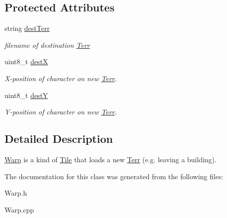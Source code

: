 \subsection*{Protected Attributes}
\begin{DoxyCompactItemize}
\item 
string \hyperlink{class_warp_a37b259e72467ec5dfe8a6e4c3a137eb3}{dest\+Terr}\hypertarget{class_warp_a37b259e72467ec5dfe8a6e4c3a137eb3}{}\label{class_warp_a37b259e72467ec5dfe8a6e4c3a137eb3}

\begin{DoxyCompactList}\small\item\em filename of destination \hyperlink{class_terr}{Terr} \end{DoxyCompactList}\item 
uint8\+\_\+t \hyperlink{class_warp_a263818ce83fe48de61f9d9cc99384cba}{destX}\hypertarget{class_warp_a263818ce83fe48de61f9d9cc99384cba}{}\label{class_warp_a263818ce83fe48de61f9d9cc99384cba}

\begin{DoxyCompactList}\small\item\em X-\/position of character on new \hyperlink{class_terr}{Terr}. \end{DoxyCompactList}\item 
uint8\+\_\+t \hyperlink{class_warp_a6407a57d12ab0c17d6c1f9dce479b635}{destY}\hypertarget{class_warp_a6407a57d12ab0c17d6c1f9dce479b635}{}\label{class_warp_a6407a57d12ab0c17d6c1f9dce479b635}

\begin{DoxyCompactList}\small\item\em Y-\/position of character on new \hyperlink{class_terr}{Terr}. \end{DoxyCompactList}\end{DoxyCompactItemize}


\subsection{Detailed Description}
\hyperlink{class_warp}{Warp} is a kind of \hyperlink{class_tile}{Tile} that loads a new \hyperlink{class_terr}{Terr} (e.\+g. leaving a building). 

The documentation for this class was generated from the following files\+:\begin{DoxyCompactItemize}
\item 
Warp.\+h\item 
Warp.\+cpp\end{DoxyCompactItemize}
